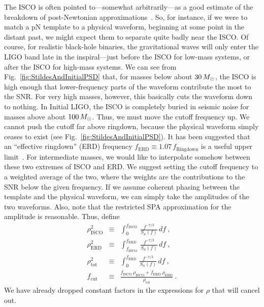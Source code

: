 The ISCO is often pointed to---somewhat arbitrarily---as a good
estimate of the breakdown of post-Newtonian
approximations~\cite{Blanchet2006}.  So, for instance, if we were to
match a pN template to a physical waveform, beginning at some point in
the distant past, we might expect them to separate quite badly near
the ISCO.  Of course, for realistic black-hole binaries, the
gravitational waves will only enter the LIGO band late in the
inspiral---just before the ISCO for low-mass systems, or after the
ISCO for high-mass systems.  We can see from
Fig.~\ref{fig:StildesAndInitialPSD} that, for masses below about
$30\,M_{\odot}$, the ISCO is high enough that lower-frequency parts of the
waveform contribute the most to the SNR.  For very high masses,
however, this basically cuts the waveform down to nothing.  In Initial
LIGO, the ISCO is completely buried in seismic noise for masses above
about $100\,M_{\odot}$.  Thus, we must move the cutoff frequency up.  We
cannot push the cutoff far above ringdown, because the physical
waveform simply ceases to exist (see
Fig.~\ref{fig:StildesAndInitialPSD}).  It has been suggested that an
``effective ringdown'' (ERD) frequency $f_{\mathrm{ERD}} \equiv 1.07\,
f_{\mathrm{Ringdown}}$ is a useful upper limit~\cite{Pan2007}.  For
intermediate masses, we would like to interpolate somehow between
these two extremes of ISCO and ERD.  We suggest setting the cutoff
frequency to a weighted average of the two, where the weights are the
contributions to the SNR below the given frequency.  If we assume
coherent phasing between the template and the physical waveform, we
can simply take the amplitudes of the two waveforms.  Also, note that
the restricted SPA approximation for the amplitude is reasonable.
Thus, define
\begin{eqnarray}
  \label{eq:rhoISCO}
  \rho_{\mathrm{ISCO}}^{2} &\equiv & \int_{0}^{f_{\mathrm{ISCO}}}\,
  \frac{f^{-7/3}}{S_{n}(f)}\, d f\ , \\
  \label{eq:rhoERD}
  \rho_{\mathrm{ERD}}^{2} &\equiv & \int_{f_{\mathrm{ISCO}}}^{f_{\mathrm{ERD}}}\,
  \frac{f^{-7/3}}{S_{n}(f)}\, d f\ , \\
  \label{eq:rhoTOT}
  \rho_{\mathrm{tot}}^{2} &\equiv & \int_{0}^{f_{\mathrm{ERD}}}\,
  \frac{f^{-7/3}}{S_{n}(f)}\, d f\ , \\
  \label{eq:fCut}
  f_{\mathrm{cut}} &\equiv & \frac{f_{\mathrm{ISCO}}\ \rho_{\mathrm{ISCO}} +
    f_{\mathrm{ERD}}\ \rho_{\mathrm{ERD}}} {\rho_{\mathrm{tot}}}\ .
\end{eqnarray}
We have already dropped constant factors in the expressions for $\rho$
that will cancel out.

